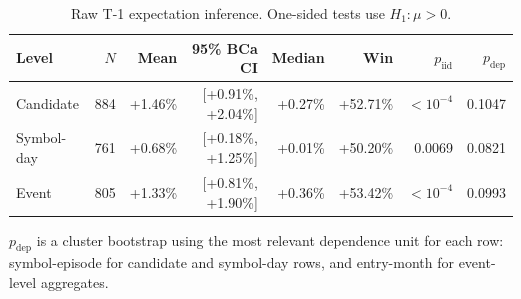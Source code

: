 \begin{table}[H]
\centering
\caption{Raw T-1 expectation inference. One-sided tests use $H_1:\mu>0$.}
\label{tab:h1inference}
\small
\begin{tabular}{lrrrrrrr}
\toprule
\textbf{Level} & $N$ & \textbf{Mean} & \textbf{95\% BCa CI} & \textbf{Median} & \textbf{Win} & \textbf{$p_{\mathrm{iid}}$} & \textbf{$p_{\mathrm{dep}}$} \\
\midrule
Candidate & 884 & +1.46\% & [+0.91\%, +2.04\%] & +0.27\% & +52.71\% & $<10^{-4}$ & 0.1047 \\
Symbol-day & 761 & +0.68\% & [+0.18\%, +1.25\%] & +0.01\% & +50.20\% & 0.0069 & 0.0821 \\
Event & 805 & +1.33\% & [+0.81\%, +1.90\%] & +0.36\% & +53.42\% & $<10^{-4}$ & 0.0993 \\
\bottomrule
\end{tabular}
\end{table}

\noindent $p_{\mathrm{dep}}$ is a cluster bootstrap using the most relevant dependence unit for each row: symbol-episode for candidate and symbol-day rows, and entry-month for event-level aggregates.
